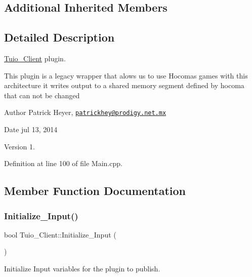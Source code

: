 \subsection*{Additional Inherited Members}


\subsection{Detailed Description}
\hyperlink{class_tuio___client}{Tuio\+\_\+\+Client} plugin. 

This plugin is a legacy wrapper that alows us to use Hocoma\textquotesingle{}s games with this architecture it writes output to a shared memory segment defined by hocoma that can not be changed \begin{DoxyAuthor}{Author}
Patrick Heyer, \href{mailto:patrickhey@prodigy.net.mx}{\tt patrickhey@prodigy.\+net.\+mx} 
\end{DoxyAuthor}
\begin{DoxyDate}{Date}
jul 13, 2014 
\end{DoxyDate}
\begin{DoxyVersion}{Version}
1. 
\end{DoxyVersion}


Definition at line 100 of file Main.\+cpp.



\subsection{Member Function Documentation}
\mbox{\label{class_tuio___client_a66bd1d9dc23405e7589d899ef6c5d892}} 
\subsubsection{\texorpdfstring{Initialize\+\_\+\+Input()}{Initialize\_Input()}}
{\footnotesize\ttfamily bool Tuio\+\_\+\+Client\+::\+Initialize\+\_\+\+Input (\begin{DoxyParamCaption}{ }\end{DoxyParamCaption})\hspace{0.3cm}{\ttfamily [virtual]}}



Initialize Input variables for the plugin to publish. 


